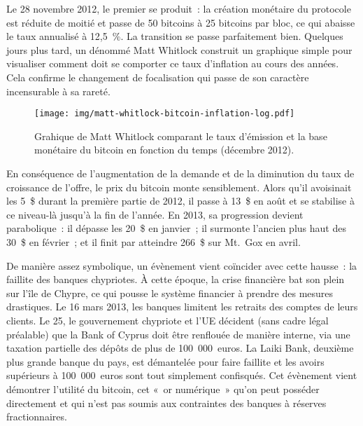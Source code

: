 Le 28 novembre 2012, le premier  se produit~: la création monétaire du protocole est réduite de moitié et passe de 50 bitcoins à 25 bitcoins par bloc, ce qui abaisse le taux annualisé à 12,5~\%. La transition se passe parfaitement bien. Quelques jours plus tard, un dénommé Matt Whitlock construit un graphique simple pour visualiser comment doit se comporter ce taux d'inflation au cours des années. Cela confirme le changement de focalisation qui passe de son caractère incensurable à sa rareté.

\begin{figure}[h]
  \centering
  \texttt{[image: img/matt-whitlock-bitcoin-inflation-log.pdf]}
  \caption{Grahique de Matt Whitlock comparant le taux d'émission et la base monétaire du bitcoin en fonction du temps (décembre 2012).}
\end{figure}

En conséquence de l'augmentation de la demande et de la diminution du taux de croissance de l'offre, le prix du bitcoin monte sensiblement. Alors qu'il avoisinait les 5~\$ durant la première partie de 2012, il passe à 13~\$ en août et se stabilise à ce niveau-là jusqu'à la fin de l'année. En 2013, sa progression devient parabolique~: il dépasse les 20~\$ en janvier~; il surmonte l'ancien plus haut des 30~\$ en février~; et il finit par atteindre 266~\$ sur Mt.~Gox en avril.

De manière assez symbolique, un évènement vient coïncider avec cette hausse~: la faillite des banques chypriotes. À cette époque, la crise financière bat son plein sur l'île de Chypre, ce qui pousse le système financier à prendre des mesures drastiques. Le 16 mars 2013, les banques limitent les retraits des comptes de leurs clients. Le 25, le gouvernement chypriote et l'UE décident (sans cadre légal préalable) que la Bank of Cyprus doit être renflouée de manière interne, via une taxation partielle des dépôts de plus de 100~000~euros. La Laiki Bank, deuxième plus grande banque du pays, est démantelée pour faire faillite et les avoirs supérieurs à 100~000~euros sont tout simplement confisqués. Cet évènement vient démontrer l'utilité du bitcoin, cet «~or numérique~» qu'on peut posséder directement et qui n'est pas soumis aux contraintes des banques à réserves fractionnaires.

